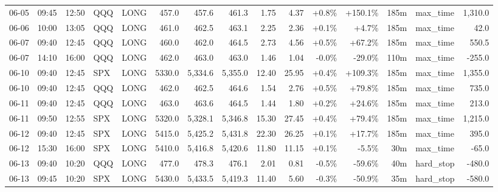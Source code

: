 \documentclass[11pt,a4paper,twoside]{article}
\begin{document}
\begin{landscape}
\begin{center}
\begin{longtable}{>{\color{txtmain}}l l l l l r r r r r r r r >{\color{txtmain}}l r}
06-05 & 09:45 & 12:50 & QQQ & LONG & 457.0 & 457.6 & 461.3 & 1.75 & 4.37 & \textcolor{wingreen}{+0.8\%} & \textcolor{wingreen}{+150.1\%} & 185m & max\_time & \textcolor{wingreen}{1,310.0} \\
06-06 & 10:00 & 13:05 & QQQ & LONG & 461.0 & 462.5 & 463.1 & 2.25 & 2.36 & \textcolor{wingreen}{+0.1\%} & \textcolor{wingreen}{+4.7\%} & 185m & max\_time & \textcolor{wingreen}{42.0} \\
06-07 & 09:40 & 12:45 & QQQ & LONG & 460.0 & 462.0 & 464.5 & 2.73 & 4.56 & \textcolor{wingreen}{+0.5\%} & \textcolor{wingreen}{+67.2\%} & 185m & max\_time & \textcolor{wingreen}{550.5} \\
06-07 & 14:10 & 16:00 & QQQ & LONG & 462.0 & 463.0 & 463.0 & 1.46 & 1.04 & \textcolor{lossred}{-0.0\%} & \textcolor{lossred}{-29.0\%} & 110m & max\_time & \textcolor{lossred}{-255.0} \\
06-10 & 09:40 & 12:45 & SPX & LONG & 5330.0 & 5,334.6 & 5,355.0 & 12.40 & 25.95 & \textcolor{wingreen}{+0.4\%} & \textcolor{wingreen}{+109.3\%} & 185m & max\_time & \textcolor{wingreen}{1,355.0} \\
06-10 & 09:40 & 12:45 & QQQ & LONG & 462.0 & 462.5 & 464.6 & 1.54 & 2.76 & \textcolor{wingreen}{+0.5\%} & \textcolor{wingreen}{+79.8\%} & 185m & max\_time & \textcolor{wingreen}{735.0} \\
06-11 & 09:40 & 12:45 & QQQ & LONG & 463.0 & 463.6 & 464.5 & 1.44 & 1.80 & \textcolor{wingreen}{+0.2\%} & \textcolor{wingreen}{+24.6\%} & 185m & max\_time & \textcolor{wingreen}{213.0} \\
06-11 & 09:50 & 12:55 & SPX & LONG & 5320.0 & 5,328.1 & 5,346.8 & 15.30 & 27.45 & \textcolor{wingreen}{+0.4\%} & \textcolor{wingreen}{+79.4\%} & 185m & max\_time & \textcolor{wingreen}{1,215.0} \\
06-12 & 09:40 & 12:45 & SPX & LONG & 5415.0 & 5,425.2 & 5,431.8 & 22.30 & 26.25 & \textcolor{wingreen}{+0.1\%} & \textcolor{wingreen}{+17.7\%} & 185m & max\_time & \textcolor{wingreen}{395.0} \\
06-12 & 15:30 & 16:00 & SPX & LONG & 5410.0 & 5,416.8 & 5,420.6 & 11.80 & 11.15 & \textcolor{wingreen}{+0.1\%} & \textcolor{lossred}{-5.5\%} & 30m & max\_time & \textcolor{lossred}{-65.0} \\
06-13 & 09:40 & 10:20 & QQQ & LONG & 477.0 & 478.3 & 476.1 & 2.01 & 0.81 & \textcolor{lossred}{-0.5\%} & \textcolor{lossred}{-59.6\%} & 40m & hard\_stop & \textcolor{lossred}{-480.0} \\
06-13 & 09:45 & 10:20 & SPX & LONG & 5430.0 & 5,433.5 & 5,419.3 & 11.40 & 5.60 & \textcolor{lossred}{-0.3\%} & \textcolor{lossred}{-50.9\%} & 35m & hard\_stop & \textcolor{lossred}{-580.0} \\

\end{longtable}
\end{center}
\end{landscape}
\end{document}
